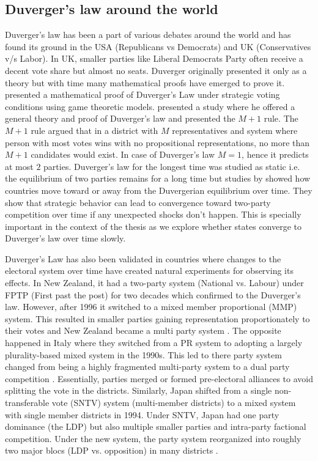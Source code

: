 \begin{sloppypar}
\subsection{Duverger's law around the world}
Duverger's law has been a part of various debates around the world and has found its ground in the USA (Republicans vs Democrats) and UK (Conservatives v/s Labor). In UK, smaller parties like Liberal Democrats Party often receive a decent vote share but almost no seats. Duverger originally presented it only as a theory but with time many mathematical proofs have emerged to prove it. \cite{palfrey1989mathematical} presented a mathematical proof of Duverger’s Law under strategic voting conditions using game theoretic models. \cite{cox1997making} presented a study where he offered a general theory and proof of Duverger's law and presented the $M+1$ rule. The $M+1$ rule argued that in a district with $M$ representatives and system where person with most votes wins with no propositional representations, no more than $M+1$ candidates would exist. In case of Duverger's law $M=1$, hence it predicts at most $2$ parties. Duverger's law for the longest time was studied as static i.e. the equilibrium of two parties  remains for a long time but studies by \cite{forand2015dynamic} showed how  countries move toward or away from the Duvergerian equilibrium over time.  They show that strategic behavior can lead to convergence toward two-party competition over time if any unexpected shocks don't happen. This is specially important in the context of the thesis as we explore whether states converge to Duverger's law over time slowly. 

\vspace{0.3cm}

Duverger's Law has also been validated in countries where changes to the electoral system over time have created natural experiments for observing its effects. In New Zealand, it had a two-party system (National vs. Labour) under FPTP (First past the post) for two decades which confirmed to the Duverger’s law. However, after 1996 it switched to a mixed member proportional (MMP) system. This resulted in smaller parties gaining representation proportionately to their votes and New Zealand became a multi party system \citep{Eberhard_2017,dunleavy2008duverger}. The opposite happened in Italy where they switched from a PR system to  adopting a largely plurality-based mixed system in the 1990s. This led to there party system changed from being a highly fragmented multi-party system to a dual party competition \citep{reed2001duverger,d2012extending}. Essentially, parties merged or formed pre-electoral alliances to avoid splitting the vote in the districts. Similarly,  Japan shifted from a single non-transferable vote (SNTV) system (multi-member districts) to a mixed system with single member districts in 1994. Under SNTV, Japan had one party dominance (the LDP) but also multiple smaller parties and intra-party factional competition. Under the new system, the party system reorganized into roughly two major blocs (LDP vs. opposition) in many districts \citep{reed2007duverger}. 


\end{sloppypar}
